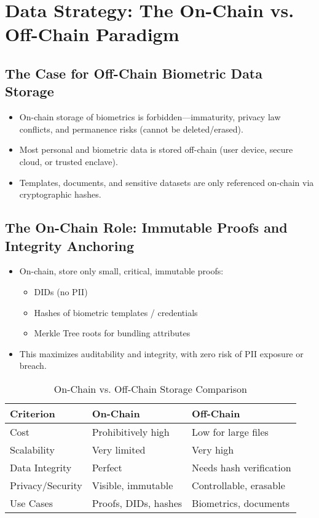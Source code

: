 \section{Data Strategy: The On-Chain vs. Off-Chain Paradigm}

\subsection{The Case for Off-Chain Biometric Data Storage}
\begin{itemize}
    \item On-chain storage of biometrics is forbidden—immaturity, privacy law conflicts, and permanence risks (cannot be deleted/erased).
    \item Most personal and biometric data is stored off-chain (user device, secure cloud, or trusted enclave).
    \item Templates, documents, and sensitive datasets are only referenced on-chain via cryptographic hashes.
\end{itemize}

\subsection{The On-Chain Role: Immutable Proofs and Integrity Anchoring}
\begin{itemize}
    \item On-chain, store only small, critical, immutable proofs:
    \begin{itemize}
        \item DIDs (no PII)
        \item Hashes of biometric templates / credentials
        \item Merkle Tree roots for bundling attributes
    \end{itemize}
    \item This maximizes auditability and integrity, with zero risk of PII exposure or breach.
\end{itemize}

\begin{table}[h]
\centering
\caption{On-Chain vs. Off-Chain Storage Comparison}
\begin{tabular}{|l|l|l|}
\hline
\textbf{Criterion} & \textbf{On-Chain} & \textbf{Off-Chain} \\
\hline
Cost & Prohibitively high & Low for large files \\
Scalability & Very limited & Very high \\
Data Integrity & Perfect & Needs hash verification \\
Privacy/Security & Visible, immutable & Controllable, erasable \\
Use Cases & Proofs, DIDs, hashes & Biometrics, documents \\
\hline
\end{tabular}
\end{table}

